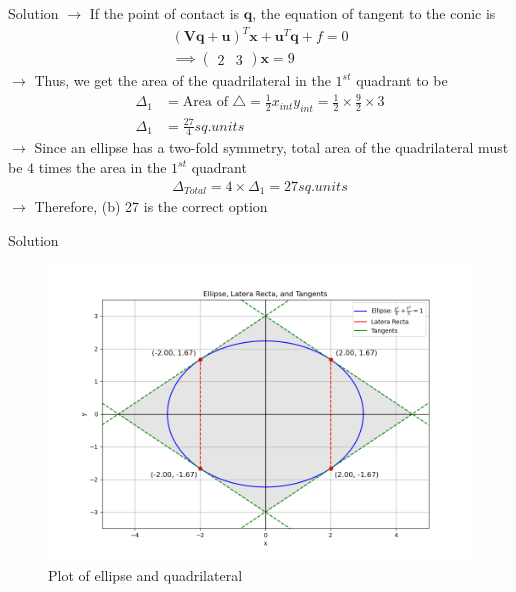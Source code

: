 \documentclass{beamer}
\numberwithin{equation}{section}
\theoremstyle{remark}
\newcommand{\myvec}[1]{\ensuremath{\begin{pmatrix}#1\end{pmatrix}}}
\let\vec\mathbf
\begin{document}
\begin{frame}{Solution}
$\rightarrow$ If the point of contact is $\vec{q}$, the equation of tangent to the conic is
\begin{align}
    (\vec{V}\vec{q}+\vec{u})^T\vec{x} + \vec{u}^T\vec{q} + f = 0\\
    \implies \myvec{2&3}\vec{x} = 9 
\end{align}
$\rightarrow$ Thus, we get the area of the quadrilateral in the $1^{st}$ quadrant to be
\begin{align}
    \Delta_1 &= \text{Area of }\triangle = \frac{1}{2}x_{int}y_{int} = \frac{1}{2}\times\frac{9}{2}\times3 \\
    \Delta_1 &= \frac{27}{4} sq. units
\end{align}
$\rightarrow$ Since an ellipse has a two-fold symmetry, total area of the quadrilateral must be $4$ times the area in the $1^{st}$ quadrant
\begin{align}
    \Delta_{Total} = 4\times\Delta_1 = 27 sq. units
\end{align}
$\rightarrow$ Therefore, (b) 27 is the correct option
\end{frame}

\begin{frame}{Solution}
\begin{figure}[h!]
   \centering
   \includegraphics[width=0.9\linewidth]{figs/01.png}
   \caption{Plot of ellipse and quadrilateral}
   \label{Plot_1}
\end{figure}
\end{frame}
\end{document}
